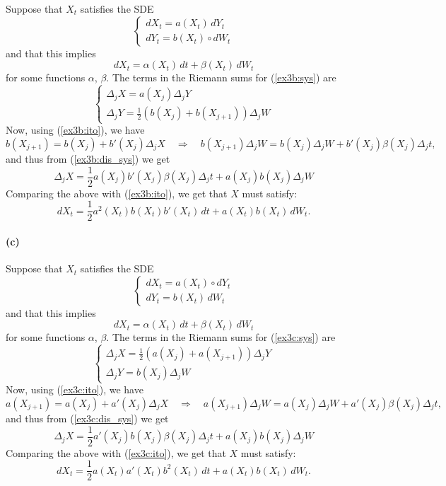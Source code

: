 \documentclass[a4paper,11pt]{article}
\theoremstyle{definition}
\theoremstyle{plain}
\theoremstyle{remark}
\begin{document}
Suppose that $X_t$ satisfies the SDE 
\begin{equation}
\begin{cases} dX_t = a(X_t)\,dY_t \\ dY_t = b(X_t)\circ dW_t \end{cases}
\label{ex3b:sys}
\end{equation}
and that this implies
\begin{equation} 
\label{ex3b:ito}
dX_t = \alpha(X_t)\,dt + \beta(X_t)\,dW_t
\end{equation}
for some functions $\alpha$, $\beta$.
The terms in the Riemann sums for (\ref{ex3b:sys}) are
\begin{equation}
\begin{cases} \Delta_j X  = a(X_j)\Delta_j Y \\  \Delta_j Y = \frac{1}{2}(b(X_j)+b(X_{j+1}))\Delta_j W \end{cases} \label{ex3b:dis_sys}
\end{equation}
Now, using (\ref{ex3b:ito}), we have
$$
b(X_{j+1}) = b(X_j) + b'(X_j)\Delta_j X \quad\Longrightarrow\quad b(X_{j+1})\Delta_jW = b(X_j)\Delta_jW + b'(X_j)\beta(X_j)\Delta_jt,
$$
and thus from (\ref{ex3b:dis_sys}) we get
$$
\Delta_j X = \frac{1}{2}a(X_j)b'(X_j)\beta(X_j)\Delta_j t + a(X_j)b(X_j)\Delta_jW 
$$
Comparing the above with (\ref{ex3b:ito}), we get that $X$ must satisfy:
$$
dX_t = \frac{1}{2}a^2(X_t)b(X_t)b'(X_t)\,dt + a(X_t)b(X_t)\,dW_t.
$$

\paragraph*{(c)}

Suppose that $X_t$ satisfies the SDE 
\begin{equation}
\begin{cases} dX_t = a(X_t)\circ dY_t \\ dY_t = b(X_t)\,dW_t \end{cases}
\label{ex3c:sys}
\end{equation}
and that this implies
\begin{equation} 
\label{ex3c:ito}
dX_t = \alpha(X_t)\,dt + \beta(X_t)\,dW_t
\end{equation}
for some functions $\alpha$, $\beta$.
The terms in the Riemann sums for (\ref{ex3c:sys}) are
\begin{equation}
\begin{cases} \Delta_j X  = \frac{1}{2}(a(X_j)+a(X_{j+1}))\Delta_j Y \\  \Delta_j Y = b(X_j)\Delta_j W \end{cases} \label{ex3c:dis_sys}
\end{equation}
Now, using (\ref{ex3c:ito}), we have
$$
a(X_{j+1}) = a(X_j) + a'(X_j)\Delta_j X \quad\Longrightarrow\quad a(X_{j+1})\Delta_jW = a(X_j)\Delta_jW + a'(X_j)\beta(X_j)\Delta_jt,
$$
and thus from (\ref{ex3c:dis_sys}) we get
$$
\Delta_j X = \frac{1}{2}a'(X_j)b(X_j)\beta(X_j)\Delta_j t + a(X_j)b(X_j)\Delta_jW 
$$
Comparing the above with (\ref{ex3c:ito}), we get that $X$ must satisfy:
$$
dX_t = \frac{1}{2}a(X_t)a'(X_t)b^2(X_t)\,dt + a(X_t)b(X_t)\,dW_t.
$$
\end{document}
